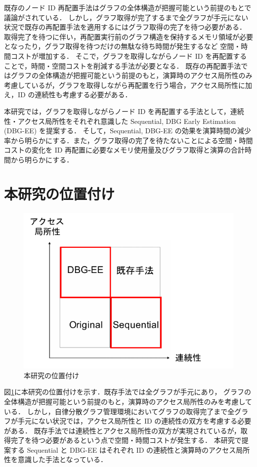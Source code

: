 既存のノード ID 再配置手法はグラフの全体構造が把握可能という前提のもとで議論がされている．
しかし，グラフ取得が完了するまで全グラフが手元にない状況で既存の再配置手法を適用するにはグラフ取得の完了を待つ必要がある．
取得完了を待つに伴い，再配置実行前のグラフ構造を保持するメモリ領域が必要となったり，グラフ取得を待つだけの無駄な待ち時間が発生するなど
空間・時間コストが増加する．
そこで，グラフを取得しながらノード ID を再配置することで，時間・空間コストを削減する手法が必要となる．
既存の再配置手法ではグラフの全体構造が把握可能という前提のもと，演算時のアクセス局所性のみ考慮しているが，グラフを取得しながら再配置を行う場合，アクセス局所性に加え，ID の連続性も考慮する必要がある．

本研究では，グラフを取得しながらノード ID を再配置する手法として，連続性・アクセス局所性をそれぞれ意識した Sequential, DBG Early Estimation (DBG-EE) を提案する．
そして，Sequential, DBG-EE の効果を演算時間の減少率から明らかにする．また，グラフ取得の完了を待たないことによる空間・時間コストの変化を 
ID 再配置に必要なメモリ使用量及びグラフ取得と演算の合計時間から明らかにする．

\section{本研究の位置付け}
\begin{figure}[t]
  \centering
  \includegraphics[width=\linewidth]{./figure/research_position.pdf}
  \caption{本研究の位置付け}
  \label{research_position}
\end{figure}
図\ref{research_position}に本研究の位置付けを示す．既存手法では全グラフが手元にあり，
グラフの全体構造が把握可能という前提のもと，演算時のアクセス局所性のみを考慮している．
しかし，自律分散グラフ管理環境においてグラフの取得完了まで全グラフが手元にない状況では，アクセス局所性と ID の連続性の双方を考慮する必要がある．
既存手法では連続性とアクセス局所性の双方が実現されているが，取得完了を待つ必要があるという点で空間・時間コストが発生する．
本研究で提案する Sequential と DBG-EE はそれぞれ ID の連続性と演算時のアクセス局所性を意識した手法となっている．

